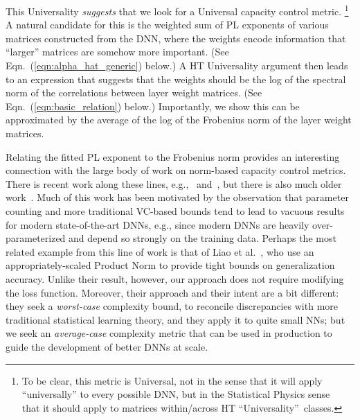 This Universality \emph{suggests} that we look for a Universal capacity control metric.%
\footnote{To be clear, this metric is Universal, not in the sense that it will apply ``universally'' to every possible DNN, but in the Statistical Physics sense~\cite{SornetteBook,BouchaudPotters03} that it should apply to matrices within/across HT ``Universality''~classes.}
A natural candidate for this is the weighted sum of PL exponents of various matrices constructed from the DNN, where the weights encode information that ``larger'' matrices are somehow more important.
(See Eqn.~(\ref{eqn:alpha_hat_generic}) below.)
A HT Universality argument then leads to an expression that suggests that the weights should be the log of the spectral norm of the correlations between layer weight matrices.
(See Eqn.~(\ref{eqn:basic_relation}) below.)
Importantly, we show this can be approximated by the average of the log of the Frobenius norm of the layer weight matrices.

Relating the fitted PL exponent to the Frobenius norm provides an interesting connection with the large body of work on norm-based capacity control metrics. 
There is recent work along these lines, e.g.,~\cite{LMBx18_TR, SHNx17_TR,PLMx18_TR} and~\cite{NTS14_TR,NTS15,NBMS17_TR,BFT17_TR,YM17_TR,KKB17_TR,NBS17_TR,AGNZ18_TR,ACH18_TR,ZF18_TR},
but there is also much older work~\cite{Bar97,MN09_TR}.
Much of this work has been motivated by the observation that parameter counting and more traditional VC-based bounds tend to lead to vacuous results for modern state-of-the-art DNNs, e.g., since modern DNNs are heavily over-parameterized and depend so strongly on the training data.
Perhaps the most related example from this line of work is that of Liao et al.~\cite{LMBx18_TR}, who use an appropriately-scaled Product Norm to provide tight bounds on generalization accuracy.
Unlike their result, however, our approach does not require modifying the loss function.
Moreover, their approach and their intent are a bit different: they seek a \emph{worst-case} complexity bound, to reconcile discrepancies with more traditional statistical learning theory, and they apply it to quite small NNs; but we seek an \emph{average-case} complexity metric that can be used in production to guide the development of better DNNs at scale.

